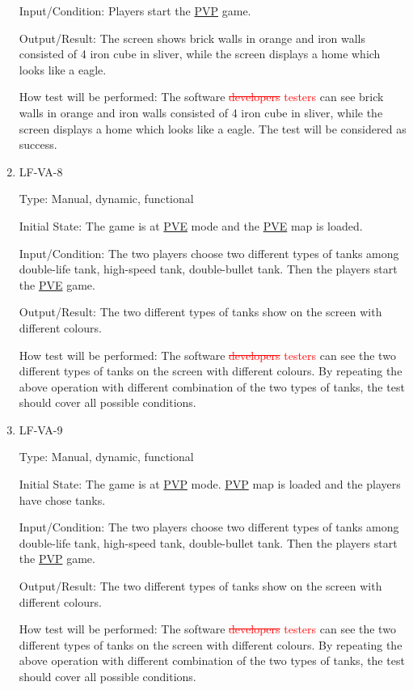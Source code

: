 \documentclass[12pt, titlepage]{article}
\begin{document}
\begin{enumerate}
Input/Condition: Players start the \underline{PVP} game. 
					
Output/Result: The screen shows brick walls in orange and iron walls consisted of 4 iron cube in sliver, while the screen displays a home which looks like a eagle.
					
How test will be performed: The software \textcolor{red}{\sout{developers} testers} can see brick walls in orange and iron walls consisted of 4 iron cube in sliver, while the screen displays a home which looks like a eagle. The test will be considered as success.

\item{LF-VA-8\\}

Type: Manual, dynamic, functional
					
Initial State: The game is at \underline{PVE} mode and the \underline{PVE} map is loaded.
					
Input/Condition:  The two players choose two different types of tanks among double-life tank, high-speed tank, double-bullet tank. Then the players start the \underline{PVE} game. 
					
Output/Result: The two different types of tanks show on the screen with different colours.
					
How test will be performed: The software \textcolor{red}{\sout{developers} testers} can see the two different types of tanks on the screen with different colours. By repeating the above operation with different combination of the two types of tanks, the test should cover all possible conditions.

\item{LF-VA-9\\}

Type: Manual, dynamic, functional
					
Initial State: The game is at \underline{PVP} mode. \underline{PVP} map is loaded and the players have chose tanks. 
					
Input/Condition: The two players choose two different types of tanks among double-life tank, high-speed tank, double-bullet tank. Then the players start the \underline{PVP} game. 
					
Output/Result: The two different types of tanks show on the screen with different colours.
					
How test will be performed: The software \textcolor{red}{\sout{developers} testers} can see the two different types of tanks on the screen with different colours. By repeating the above operation with different combination of the two types of tanks, the test should cover all possible conditions.


\end{enumerate}
\end{document}
